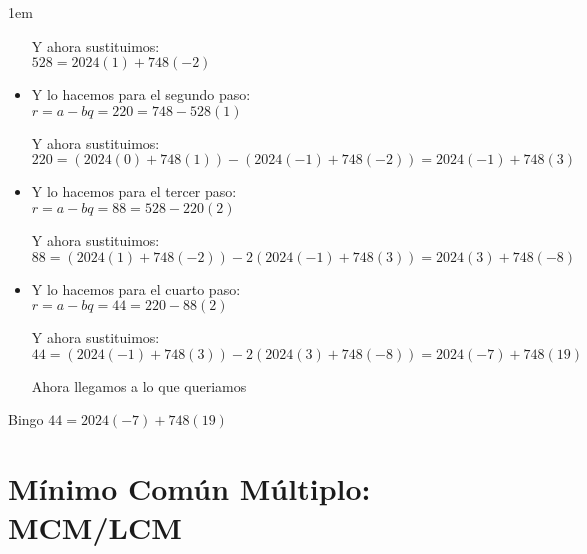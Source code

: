 \documentclass[12pt]{report}                                    %
\newenvironment{SmallIndentation}[1][0.75em]                    %
    {\begin{adjustwidth}{#1}{}\begin{footnotesize}}                 %
    {\end{footnotesize}\end{adjustwidth}}                           %
\begin{document}
\begin{SmallIndentation}[1em]
\begin{itemize}
                        Y ahora sustituimos:\\
                        $528 = 2024(1) + 748(-2)$


                    \item
                        Y lo hacemos para el segundo paso:\\
                        $r = a - bq = 220 = 748 - 528(1)$

                        Y ahora sustituimos:\\
                        $220 = (2024(0) + 748(1)) - (2024(-1) + 748(-2)) = 2024(-1) + 748(3)$                    

                    \item
                        Y lo hacemos para el tercer paso:\\
                        $r = a - bq = 88 = 528 - 220(2)$

                        Y ahora sustituimos:\\
                        $88 = (2024(1) + 748(-2)) - 2(2024(-1) + 748(3)) = 2024(3) + 748(-8)$    

                    \item
                        Y lo hacemos para el cuarto paso:\\
                        $r = a - bq = 44 = 220 - 88(2)$

                        Y ahora sustituimos:\\
                        $44 = (2024(-1) + 748(3)) - 2(2024(3) + 748(-8)) = 2024(-7) + 748(19)$   

                        Ahora llegamos a lo que queriamos 

                \end{itemize}

                Bingo $44 = 2024(-7) + 748(19)$ 

            \end{SmallIndentation}


            

    \clearpage
    \section{Mínimo Común Múltiplo: MCM/LCM}

\end{document}
